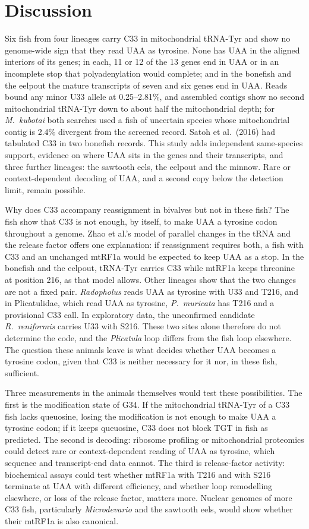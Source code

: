 \documentclass[11pt, a4paper]{article}
\begin{document}
\section{Discussion}
Six fish from four lineages carry C33 in mitochondrial tRNA-Tyr and show no genome-wide sign that they read UAA as tyrosine. None has UAA in the aligned interiors of its genes; in each, 11 or 12 of the 13 genes end in UAA or in an incomplete stop that polyadenylation would complete; and in the bonefish and the eelpout the mature transcripts of seven and six genes end in UAA. Reads bound any minor U33 allele at 0.25--2.81\%, and assembled contigs show no second mitochondrial tRNA-Tyr down to about half the mitochondrial depth; for \textit{M.\ kubotai} both searches used a fish of uncertain species whose mitochondrial contig is 2.4\% divergent from the screened record. Satoh et al.\ (2016) had tabulated C33 in two bonefish records. This study adds independent same-species support, evidence on where UAA sits in the genes and their transcripts, and three further lineages: the sawtooth eels, the eelpout and the minnow. Rare or context-dependent decoding of UAA, and a second copy below the detection limit, remain possible.

Why does C33 accompany reassignment in bivalves but not in these fish? The fish show that C33 is not enough, by itself, to make UAA a tyrosine codon throughout a genome. Zhao et al.'s model of parallel changes in the tRNA and the release factor offers one explanation: if reassignment requires both, a fish with C33 and an unchanged mtRF1a would be expected to keep UAA as a stop. In the bonefish and the eelpout, tRNA-Tyr carries C33 while mtRF1a keeps threonine at position 216, as that model allows. Other lineages show that the two changes are not a fixed pair. \textit{Radopholus} reads UAA as tyrosine with U33 and T216, and in Plicatulidae, which read UAA as tyrosine, \textit{P.\ muricata} has T216 and a provisional C33 call. In exploratory data, the unconfirmed candidate \textit{R.\ reniformis} carries U33 with S216. These two sites alone therefore do not determine the code, and the \textit{Plicatula} loop differs from the fish loop elsewhere. The question these animals leave is what decides whether UAA becomes a tyrosine codon, given that C33 is neither necessary for it nor, in these fish, sufficient.

Three measurements in the animals themselves would test these possibilities. The first is the modification state of G34. If the mitochondrial tRNA-Tyr of a C33 fish lacks queuosine, losing the modification is not enough to make UAA a tyrosine codon; if it keeps queuosine, C33 does not block TGT in fish as predicted. The second is decoding: ribosome profiling or mitochondrial proteomics could detect rare or context-dependent reading of UAA as tyrosine, which sequence and transcript-end data cannot. The third is release-factor activity: biochemical assays could test whether mtRF1a with T216 and with S216 terminate at UAA with different efficiency, and whether loop remodelling elsewhere, or loss of the release factor, matters more. Nuclear genomes of more C33 fish, particularly \textit{Microdevario} and the sawtooth eels, would show whether their mtRF1a is also canonical.
\end{document}
